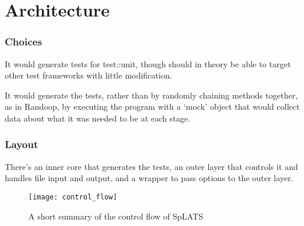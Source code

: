 \chapter{Architecture}
  \subsection{Choices}
    It would generate tests for test::unit, though should in theory be able to target other test frameworks with little modification.

    It would generate the tests, rather than by randomly chaining methods together, as in Randoop, by executing the program with a `mock' object that would collect data about what it was needed to be at each stage.

  \subsection{Layout}
    There's an inner core that generates the tests, an outer layer that controls it and handles file input and output, and a wrapper to pass options to the outer layer.

\begin{center}
\begin{figure}
\texttt{[image: control\_flow]}
\caption{A short summary of the control flow of SpLATS}
\end{figure}
\end{center}
